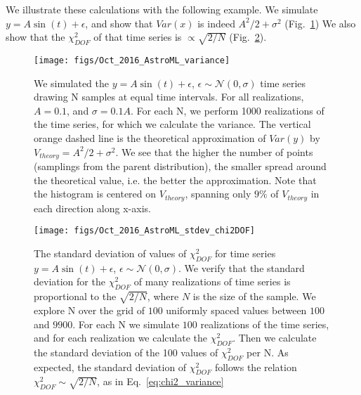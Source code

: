 \documentclass[fleqn,usenatbib]{mnras}  %
\begin{document}



We illustrate these calculations with the following example. We simulate $y = A \sin(t) + \epsilon$, and show that $Var(x)$ is indeed $A^{2}/2  + \sigma^{2}$ (Fig.~\ref{fig:time_series_variance})  We also show that the $\chi^{2}_{DOF}$ of that time series is $\propto \sqrt{2/N}$ (Fig.~\ref{fig:time_series_chi2}).   


\begin{figure}
 \texttt{[image: figs/Oct\_2016\_AstroML\_variance]}
 \caption{We simulated the $y = A \sin(t) + \epsilon $, $\epsilon \sim \mathcal{N}(0, \sigma)$ time series drawing  N samples at equal time intervals.  For all realizations,  $A=0.1$, and $\sigma = 0.1 A$. For each N, we perform 1000 realizations of the time series, for which we calculate the variance. The  vertical orange dashed line is the theoretical approximation of $Var(y)$ by $V_{theory} = A^{2}/2  + \sigma^{2}$. We see that the higher the number of points (samplings from the parent distribution), the smaller spread around the theoretical value, i.e. the better the approximation.  Note that the histogram is centered on $V_{theory}$, spanning only $9\%$ of $V_{theory}$ in each direction along x-axis. }
 \label{fig:time_series_variance}
\end{figure}




\begin{figure}
\texttt{[image: figs/Oct\_2016\_AstroML\_stdev\_chi2DOF]}
\caption{The standard deviation of values of $\chi^{2}_{DOF}$ for time series $y = A \sin(t) + \epsilon $, $\epsilon \sim \mathcal{N}(0, \sigma)$. We verify that the standard deviation for the $\chi^{2}_{DOF}$ of many realizations of time series is proportional to the $\sqrt{2/N}$, where $N$ is the size of the sample.  We explore N over the grid of $100$  uniformly spaced values between $100$ and $9900$. For each N we simulate $100$ realizations of the time series, and for each realization we calculate  the $\chi^{2}_{DOF}$. Then we calculate the standard deviation of the 100 values of  $\chi^{2}_{DOF}$ per N. As expected, the standard deviation of $\chi^{2}_{DOF}$ follows the relation  $\chi^{2}_{DOF} \sim \sqrt{2/N}$, as in Eq.~\ref{eq:chi2_variance}}
\label{fig:time_series_chi2}
\end{figure}
\end{document}
